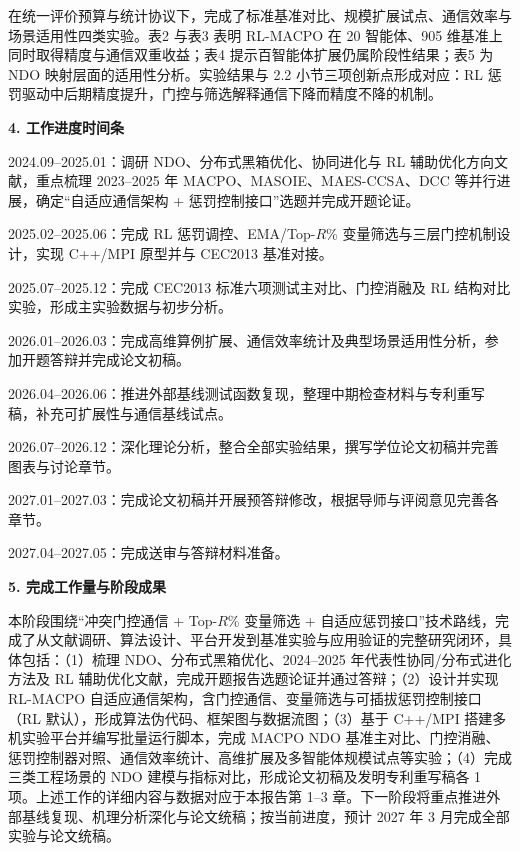 \par
\indent
在统一评价预算与统计协议下，完成了标准基准对比、规模扩展试点、通信效率与场景适用性四类实验。表2 与表3 表明 RL-MACPO 在 20 智能体、905 维基准上同时取得精度与通信双重收益；表4 提示百智能体扩展仍属阶段性结果；表5 为 NDO 映射层面的适用性分析。实验结果与 2.2 小节三项创新点形成对应：RL 惩罚驱动中后期精度提升，门控与筛选解释通信下降而精度不降的机制。

\par
\indent
\noindent\textbf{4. 工作进度时间条}


\par
2024.09--2025.01：调研 NDO、分布式黑箱优化、协同进化与 RL 辅助优化方向文献，重点梳理 2023--2025 年 MACPO、MASOIE、MAES-CCSA、DCC 等并行进展，确定“自适应通信架构 + 惩罚控制接口”选题并完成开题论证。\\
\par
2025.02--2025.06：完成 RL 惩罚调控、EMA/Top-$R$\% 变量筛选与三层门控机制设计，实现 C++/MPI 原型并与 CEC2013 基准对接。\\
\par
2025.07--2025.12：完成 CEC2013 标准六项测试主对比、门控消融及 RL 结构对比实验，形成主实验数据与初步分析。\\
\par
2026.01--2026.03：完成高维算例扩展、通信效率统计及典型场景适用性分析，参加开题答辩并完成论文初稿。

\par
2026.04--2026.06：推进外部基线测试函数复现，整理中期检查材料与专利重写稿，补充可扩展性与通信基线试点。\\
\par
2026.07--2026.12：深化理论分析，整合全部实验结果，撰写学位论文初稿并完善图表与讨论章节。\\
\par
2027.01--2027.03：完成论文初稿并开展预答辩修改，根据导师与评阅意见完善各章节。\\
\par
2027.04--2027.05：完成送审与答辩材料准备。

\par
\indent
\noindent\textbf{5. 完成工作量与阶段成果}

\par
\indent
本阶段围绕“冲突门控通信 + Top-$R$\% 变量筛选 + 自适应惩罚接口”技术路线，完成了从文献调研、算法设计、平台开发到基准实验与应用验证的完整研究闭环，具体包括：（1）梳理 NDO、分布式黑箱优化、2024--2025 年代表性协同/分布式进化方法及 RL 辅助优化文献，完成开题报告选题论证并通过答辩；（2）设计并实现 RL-MACPO 自适应通信架构，含门控通信、变量筛选与可插拔惩罚控制接口（RL 默认），形成算法伪代码、框架图与数据流图；（3）基于 C++/MPI 搭建多机实验平台并编写批量运行脚本，完成 MACPO NDO 基准主对比、门控消融、惩罚控制器对照、通信效率统计、高维扩展及多智能体规模试点等实验；（4）完成三类工程场景的 NDO 建模与指标对比，形成论文初稿及发明专利重写稿各 1 项。上述工作的详细内容与数据对应于本报告第 1--3 章。下一阶段将重点推进外部基线复现、机理分析深化与论文统稿；按当前进度，预计 2027 年 3 月完成全部实验与论文统稿。

